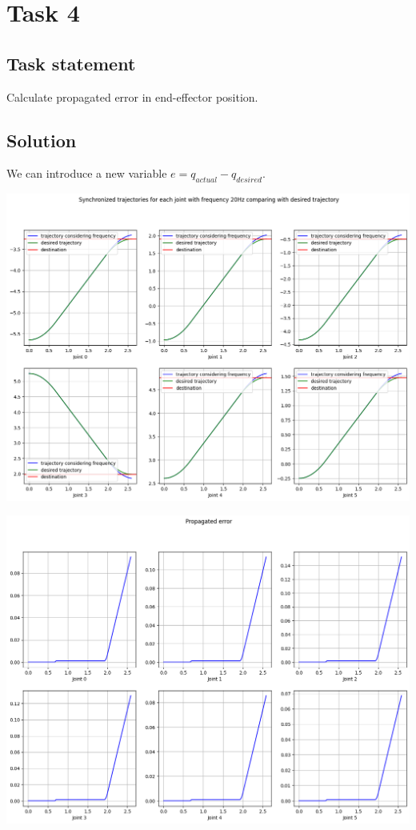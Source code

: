 \section*{Task 4}

\subsection*{Task statement}

Calculate propagated error in end-effector position.

\subsection*{Solution}

We can introduce a new variable $e = q_{actual} - q_{desired}$.

\includegraphics[width=\linewidth]{images/trajectory_comparing.png}

\includegraphics[width=\linewidth]{images/error.png}